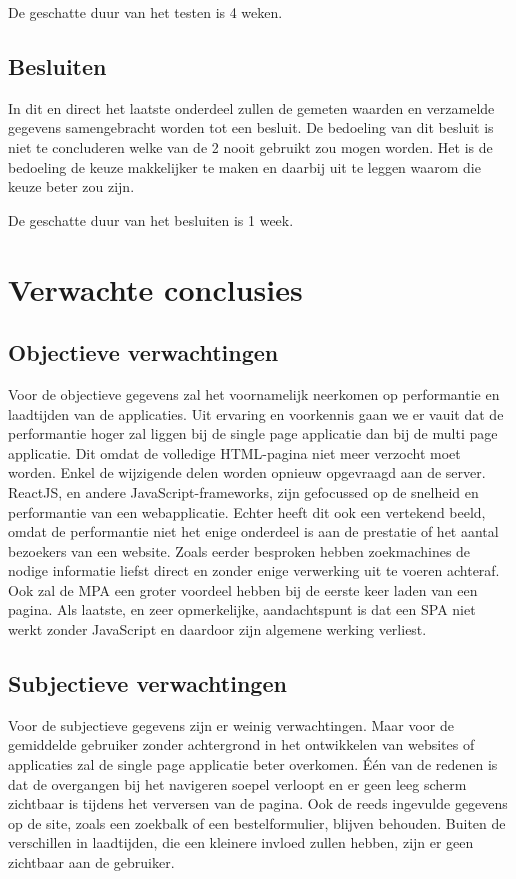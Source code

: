 \documentclass{hogent-article}
\begin{document}
De geschatte duur van het testen is 4 weken.

\subsection{Besluiten}
In dit en direct het laatste onderdeel zullen de gemeten waarden en verzamelde gegevens samengebracht worden tot een besluit.
De bedoeling van dit besluit is niet te concluderen welke van de 2 nooit gebruikt zou mogen worden.
Het is de bedoeling de keuze makkelijker te maken en daarbij uit te leggen waarom die keuze beter zou zijn.

De geschatte duur van het besluiten is 1 week.


\section{Verwachte conclusies}

\subsection{Objectieve verwachtingen}
Voor de objectieve gegevens zal het voornamelijk neerkomen op performantie en laadtijden van de applicaties.
Uit ervaring en voorkennis gaan we er vauit dat de performantie hoger zal liggen bij de single page applicatie dan bij de multi page applicatie.
Dit omdat de volledige HTML-pagina niet meer verzocht moet worden. Enkel de wijzigende delen worden opnieuw opgevraagd aan de server.
ReactJS, en andere JavaScript-frameworks, zijn gefocussed op de snelheid en performantie van een webapplicatie.
Echter heeft dit ook een vertekend beeld, omdat de performantie niet het enige onderdeel is aan de prestatie of het aantal bezoekers van een website.
Zoals eerder besproken hebben zoekmachines de nodige informatie liefst direct en zonder enige verwerking uit te voeren achteraf.
Ook zal de MPA een groter voordeel hebben bij de eerste keer laden van een pagina.
Als laatste, en zeer opmerkelijke, aandachtspunt is dat een SPA niet werkt zonder JavaScript en daardoor zijn algemene werking verliest.

\subsection{Subjectieve verwachtingen}
Voor de subjectieve gegevens zijn er weinig verwachtingen.
Maar voor de gemiddelde gebruiker zonder achtergrond in het ontwikkelen van websites of applicaties zal de single page applicatie beter overkomen.
Één van de redenen is dat de overgangen bij het navigeren soepel verloopt en er geen leeg scherm zichtbaar is tijdens het verversen van de pagina.
Ook de reeds ingevulde gegevens op de site, zoals een zoekbalk of een bestelformulier, blijven behouden.
Buiten de verschillen in laadtijden, die een kleinere invloed zullen hebben, zijn er geen zichtbaar aan de gebruiker.
\end{document}
